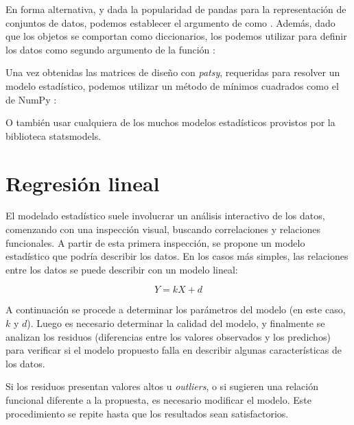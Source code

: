 
En forma alternativa, y dada la popularidad de pandas para la representación de conjuntos de datos, podemos establecer el argumento  de  como . Además, dado que los objetos  se comportan como diccionarios, los podemos utilizar para definir los datos como segundo argumento de la función :


Una vez obtenidas las matrices de diseño con \textit{patsy}, requeridas para resolver un modelo estadístico, podemos utilizar un método de mínimos cuadrados como el de NumPy :

O también usar cualquiera de los muchos modelos estadísticos provistos por la biblioteca statsmodels.

\section{Regresión lineal}
El modelado estadístico suele involucrar un análisis interactivo de los datos, comenzando con una inspección visual, buscando correlaciones y relaciones funcionales. A partir de esta primera inspección, se propone un modelo estadístico que podría describir los datos. En los casos más simples, las relaciones entre los datos se puede describir con un modelo lineal:

\[ Y = k X + d \]

A continuación se procede a determinar los parámetros del modelo (en este caso, $k$ y $d$). Luego es necesario determinar la calidad del modelo, y finalmente se analizan los residuos (diferencias entre los valores observados y los predichos) para verificar si el modelo propuesto falla en describir algunas características de los datos.

Si los residuos presentan valores altos u \textit{outliers}, o si sugieren una relación funcional diferente a la propuesta, es necesario modificar el modelo. Este procedimiento se repite hasta que los resultados sean satisfactorios.

